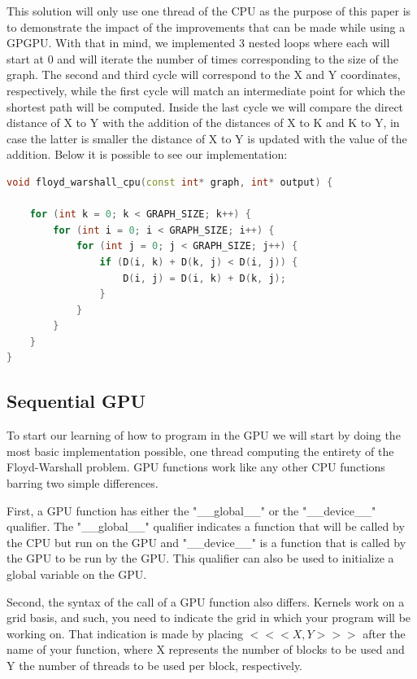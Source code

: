 \documentclass[conference]{IEEEtran}
\begin{document}
This solution will only use one thread of the CPU as the purpose of this paper is to demonstrate the impact of the improvements that can be made while using a GPGPU.
With that in mind, we implemented 3 nested loops where each will start at 0 and will iterate the number of times corresponding to the size of the graph.
The second and third cycle will correspond to the X and Y coordinates, respectively, 
while the first cycle will match an intermediate point for which the shortest path will be computed.
Inside the last cycle we will compare the direct distance of X to Y with the addition of the distances of X to K and K to Y, in case the latter is smaller the distance of X to Y is updated with the value of the addition.
Below it is possible to see our implementation:

\begin{lstlisting}[language=C++, caption=Sequential CPU]
void floyd_warshall_cpu(const int* graph, int* output) {
	
	for (int k = 0; k < GRAPH_SIZE; k++) {
		for (int i = 0; i < GRAPH_SIZE; i++) {
			for (int j = 0; j < GRAPH_SIZE; j++) {
				if (D(i, k) + D(k, j) < D(i, j)) {
					D(i, j) = D(i, k) + D(k, j);
				}
			}
		}
	}
}
\end{lstlisting}

\subsection{Sequential GPU}
To start our learning of how to program in the GPU we will start by doing the most basic implementation possible, one thread computing the entirety of the Floyd-Warshall problem.
GPU functions work like any other CPU functions barring two simple differences. 

First, a GPU function has either the "\_\_global\_\_" or the "\_\_device\_\_" qualifier.
The "\_\_global\_\_" qualifier indicates a function that will be called by the CPU but run on the GPU and "\_\_device\_\_" is a function that is called by the GPU to be run by the GPU. 
This qualifier can also be used to initialize a global variable on the GPU.

Second, the syntax of the call of a GPU function also differs. Kernels work on a grid basis, and such, you need to indicate the grid in which your program will be working on. 
That indication is made by placing
\begin{math} <<< X, Y >>> \end{math}
after the name of your function, where X represents the number of blocks to be used and Y the number of threads to be used per block, respectively. 
\end{document}
